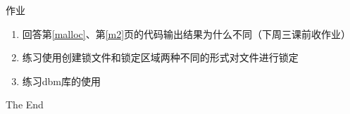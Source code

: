 \documentclass{beamer}
\begin{document}
\begin{frame}{作业}
\begin{enumerate}
\item
回答第\ref{malloc}、第\ref{m2}页的代码输出结果为什么不同（下周三课前收作业）
\item
练习使用创建锁文件和锁定区域两种不同的形式对文件进行锁定
\item
练习dbm库的使用
\end{enumerate}
\end{frame}

\begin{frame}
\Huge{\centerline{The End}}
\end{frame}
\end{document}
